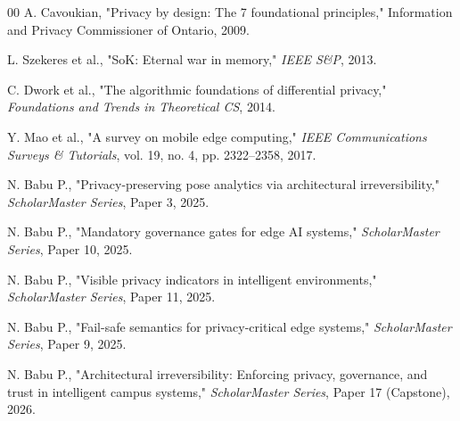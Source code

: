 \documentclass[conference]{IEEEtran}
\begin{document}
\begin{thebibliography}{00}
 A. Cavoukian, "Privacy by design: The 7 foundational principles," Information and Privacy Commissioner of Ontario, 2009.


 L. Szekeres et al., "SoK: Eternal war in memory," \textit{IEEE S\&P}, 2013.


 C. Dwork et al., "The algorithmic foundations of differential privacy," \textit{Foundations and Trends in Theoretical CS}, 2014.


 Y. Mao et al., "A survey on mobile edge computing," \textit{IEEE Communications Surveys \& Tutorials}, vol. 19, no. 4, pp. 2322–2358, 2017.


 N. Babu P., "Privacy-preserving pose analytics via architectural irreversibility," \textit{ScholarMaster Series}, Paper 3, 2025.

 N. Babu P., "Mandatory governance gates for edge AI systems," \textit{ScholarMaster Series}, Paper 10, 2025.

 N. Babu P., "Visible privacy indicators in intelligent environments," \textit{ScholarMaster Series}, Paper 11, 2025.

 N. Babu P., "Fail-safe semantics for privacy-critical edge systems," \textit{ScholarMaster Series}, Paper 9, 2025.

 N. Babu P., "Architectural irreversibility: Enforcing privacy, governance, and trust in intelligent campus systems," \textit{ScholarMaster Series}, Paper 17 (Capstone), 2026.


\end{thebibliography}
\end{document}
